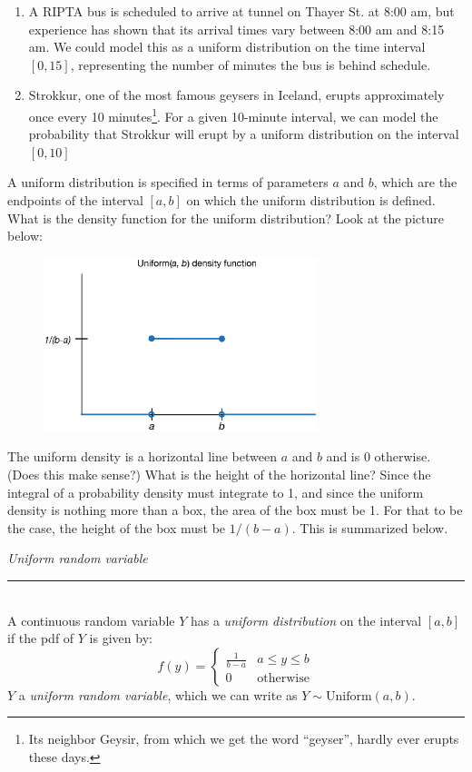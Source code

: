 \documentclass[notes.tex]{subfiles}
\begin{document}
\begin{enumerate}
\item A RIPTA bus is scheduled to arrive at tunnel on Thayer St. at 8:00 am, but experience has shown that its arrival times vary between 8:00 am and 8:15 am. We could model this as a uniform distribution on the time interval $[0, 15]$, representing the number of minutes the bus is behind schedule. 
\item Strokkur, one of the most famous geysers in Iceland, erupts approximately once every 10 minutes\footnote{Its neighbor Geysir, from which we get the word ``geyser'', hardly ever erupts these days.}. For a given 10-minute interval, we can model the probability that Strokkur will erupt by a uniform distribution on the interval $[0, 10]$
\end{enumerate}

A uniform distribution is specified in terms of parameters $a$ and $b$, which are the endpoints of the interval $[a, b]$ on which the uniform distribution is defined. What is the density function for the uniform distribution? Look at the picture below:
\begin{figure}[H]
\centering
\includegraphics[width=8cm]{uniformdensity.eps}
\end{figure}
The uniform density is a horizontal line between $a$ and $b$ and is 0 otherwise. (Does this make sense?) What is the height of the horizontal line? Since the integral of a probability density must integrate to 1, and since the uniform density is nothing more than a box, the area of the box must be 1. For that to be the case, the height of the box must be $1 / (b-a)$. This is summarized below.

\begin{framed}
\emph{Uniform random variable}\\
  \rule{\dimexpr{}\fboxrule}{.1pt} \\
A continuous random variable $Y$ has a \emph{uniform distribution} on the interval $[a, b]$ if the pdf of $Y$
is given by:
\[
f(y) = \begin{cases}
\frac{1}{b-a} & a \leq y \leq b \\
0 & \text{otherwise}
\end{cases}
\]
$Y$ a \emph{uniform random variable}, which we can write as $Y \sim\text{Uniform}(a,b)$.
\end{framed}
\end{document}
